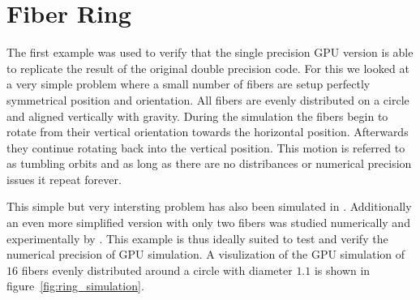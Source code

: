 \documentclass[a4paper,11pt]{kth-mag}
\begin{document}
\section{Fiber Ring}
\label{sec:example_ring}

The first example was used to verify that the single precision GPU version is able to replicate the result of the original double precision code. For this we looked at a very simple problem where a small number of fibers are setup perfectly symmetrical position and orientation. All fibers are evenly distributed on a circle and aligned vertically with gravity. During the simulation the fibers begin to rotate from their vertical orientation towards the horizontal position. Afterwards they continue rotating back into the vertical position. This motion is referred to as tumbling orbits and as long as there are no distribances or numerical precision issues it repeat forever.

This simple but very intersting problem has also been simulated in \cite{}. Additionally an even more simplified version with only two fibers was studied numerically and experimentally by \cite{}. This example is thus ideally suited to test and verify the numerical precision of GPU simulation. A visulization of the GPU simulation of $16$ fibers evenly distributed around a circle with diameter $1.1$ is shown in figure~\ref{fig:ring_simulation}.
\end{document}
